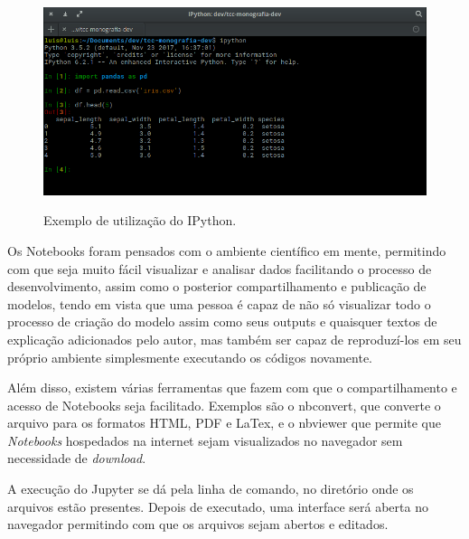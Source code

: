 \begin{figure}[h]
\caption{\small Exemplo de utilização do IPython.}
\centering
\includegraphics[scale=0.40]{figs/exemplo-ipython.png}
\label{f.exemplo-ipython}
\end{figure}

Os Notebooks foram pensados com o ambiente científico em mente, permitindo com que seja muito fácil visualizar e analisar dados facilitando o processo de desenvolvimento, assim como o posterior compartilhamento e publicação de modelos, tendo em vista que uma pessoa é capaz de não só visualizar todo o processo de criação do modelo assim como seus outputs e quaisquer textos de explicação adicionados pelo autor, mas também ser capaz de reproduzí-los em seu próprio ambiente simplesmente executando os códigos novamente.

Além disso, existem várias ferramentas que fazem com que o compartilhamento e acesso de Notebooks seja facilitado. Exemplos são o nbconvert, que converte o arquivo para os formatos HTML, PDF e LaTex, e o nbviewer que permite que \textit{Notebooks} hospedados na internet sejam visualizados no navegador sem necessidade de \textit{download}.

A execução do Jupyter se dá pela linha de comando, no diretório onde os arquivos estão presentes. Depois de executado, uma interface será aberta no navegador permitindo com que os arquivos sejam abertos e editados.


